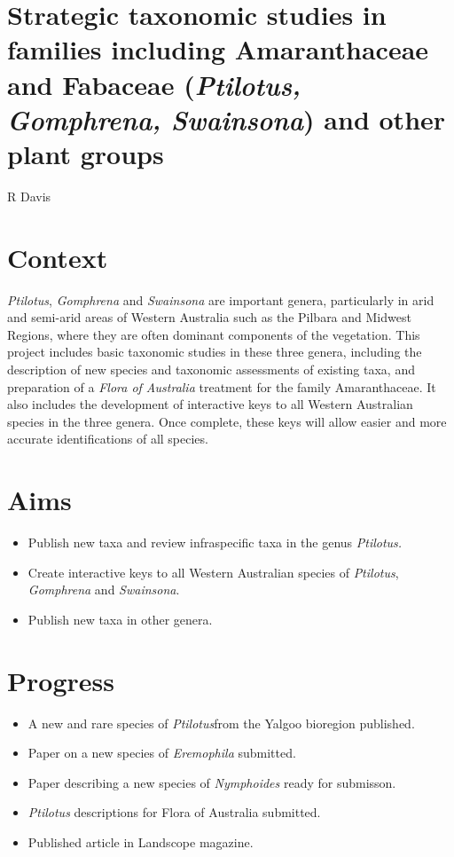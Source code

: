 \documentclass[version=last,
    paper=a4, %
    10pt, %
    usenames,
    dvipsnames,
    oneside, %
    headings=openany, %
    DIV=15 %
]{scrbook}
\begin{document}
\section*{Strategic taxonomic studies in families including Amaranthaceae and
Fabaceae (\emph{Ptilotus, Gomphrena, Swainsona}) and other plant groups
}

R Davis


\section*{Context}
\emph{Ptilotus}, \emph{Gomphrena} and \emph{Swainsona} are important
genera, particularly in arid and semi-arid areas of Western Australia
such as the Pilbara and Midwest Regions, where they are often dominant
components of the vegetation. This project includes basic taxonomic
studies in these three genera, including the description of new species
and taxonomic assessments of existing taxa, and preparation of a
\emph{Flora of Australia} treatment for the family Amaranthaceae. It
also includes the development of interactive keys to all Western
Australian species in the three genera. Once complete, these keys will
allow easier and more accurate identifications of all species.



\section*{Aims}
\begin{itemize}
\itemsep1pt\parskip0pt
\item
  Publish new taxa and review infraspecific taxa in the genus
  \emph{Ptilotus.}
\item
  Create interactive keys to all Western Australian species of
  \emph{Ptilotus}, \emph{Gomphrena} and \emph{Swainsona}.
\item
  Publish new taxa in other genera.
\end{itemize}



\section*{Progress}
\begin{itemize}
\itemsep1pt\parskip0pt
\item
  A new and rare species of \emph{Ptilotus}from the Yalgoo bioregion
  published.
\item
  Paper on a new species of \emph{Eremophila} submitted.
\item
  Paper describing a new species of \emph{Nymphoides} ready for
  submisson.
\item
  \emph{Ptilotus} descriptions for Flora of Australia submitted.
\item
  Published article in Landscope magazine.
\end{itemize}
\end{document}
